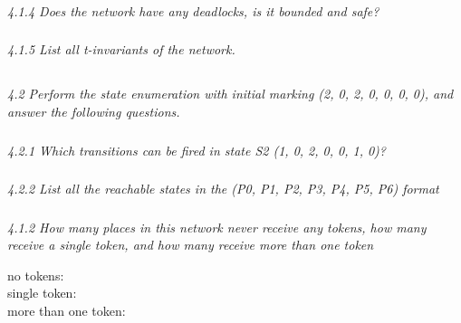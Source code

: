 \documentclass[letterpaper]{article}
\begin{document}
\subsubsection{}
\textit{ 4.1.4  Does the network have any deadlocks, is it bounded and safe?}

\subsubsection{}
\textit{ 4.1.5  List all t-invariants of the network.}

\subsection{}
\textit{ 4.2  Perform the state enumeration with initial marking (2, 0, 2, 0, 0, 0, 0), and answer the following questions.}

\subsubsection{}
\textit{ 4.2.1  Which transitions can be fired in state S2 (1, 0, 2, 0, 0, 1, 0)?}

\subsubsection{}
\textit{ 4.2.2  List all the reachable states in the (P0, P1, P2, P3, P4, P5, P6) format}

\subsubsection{}
\textit{ 4.1.2  How many places in this network never receive any tokens, how many receive a single token, and how many receive more than one token}

no tokens: \\
single token: \\
more than one token: \\
\end{document}
